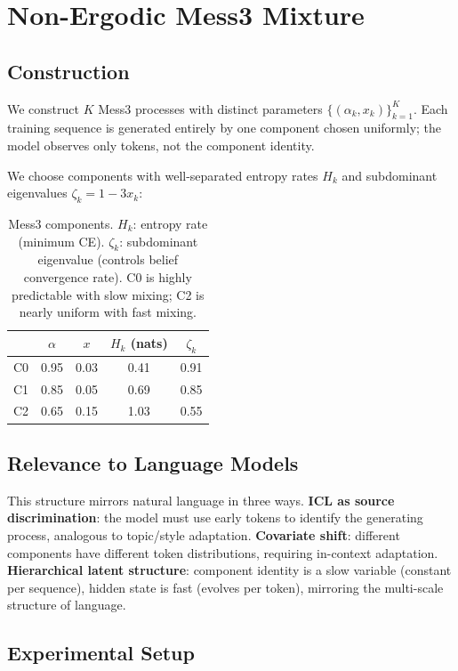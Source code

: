 \section{Non-Ergodic Mess3 Mixture}

\subsection{Construction}

We construct $K$ Mess3 processes with distinct parameters $\{(\alpha_k, x_k)\}_{k=1}^K$. Each training sequence is generated entirely by one component chosen uniformly; the model observes only tokens, not the component identity.

We choose components with well-separated entropy rates $H_k$ and subdominant eigenvalues $\zeta_k = 1-3x_k$:

\begin{table}[h]
\centering
\small
\begin{tabular}{lcccc}
\toprule
 & $\alpha$ & $x$ & $H_k$ (nats) & $\zeta_k$ \\
\midrule
C0 & 0.95 & 0.03 & 0.41 & 0.91 \\
C1 & 0.85 & 0.05 & 0.69 & 0.85 \\
C2 & 0.65 & 0.15 & 1.03 & 0.55 \\
\bottomrule
\end{tabular}
\caption{Mess3 components. $H_k$: entropy rate (minimum CE). $\zeta_k$: subdominant eigenvalue (controls belief convergence rate). C0 is highly predictable with slow mixing; C2 is nearly uniform with fast mixing.}
\label{tab:components}
\end{table}

\subsection{Relevance to Language Models}
\label{sec:relevance}

This structure mirrors natural language in three ways. \textbf{ICL as source discrimination}: the model must use early tokens to identify the generating process, analogous to topic/style adaptation. \textbf{Covariate shift}: different components have different token distributions, requiring in-context adaptation. \textbf{Hierarchical latent structure}: component identity is a slow variable (constant per sequence), hidden state is fast (evolves per token), mirroring the multi-scale structure of language.

\subsection{Experimental Setup}


